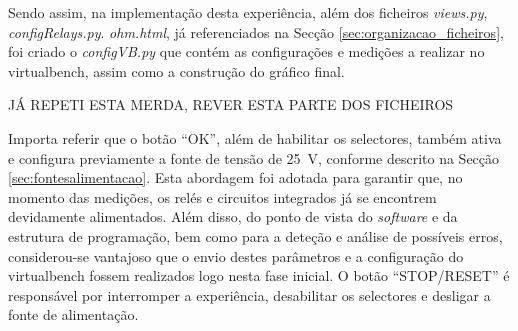 Sendo assim, na implementação desta experiência, além dos ficheiros \textit{views.py}, \textit{configRelays.py}. \textit{ohm.html}, já referenciados na Secção \ref{sec:organizacao_ficheiros}, foi criado o \textit{configVB.py} que contém as configurações e medições a realizar no \acrshort{virtualbench}, assim como a construção do gráfico final.

JÁ REPETI ESTA MERDA, REVER ESTA PARTE DOS FICHEIROS




Importa referir que o botão ``OK'', além de habilitar os selectores, também ativa e configura previamente a fonte de tensão de \SI{25}{\volt}, conforme descrito na Secção \ref{sec:fontesalimentacao}. Esta abordagem foi adotada para garantir que, no momento das medições, os relés e circuitos integrados já se encontrem devidamente alimentados. Além disso, do ponto de vista do \textit{software} e da estrutura de programação, bem como para a deteção e análise de possíveis erros, considerou-se vantajoso que o envio destes parâmetros e a configuração do \acrshort{virtualbench} fossem realizados logo nesta fase inicial.
O botão ``STOP/RESET'' é responsável por interromper a experiência, desabilitar os selectores e desligar a fonte de alimentação.

